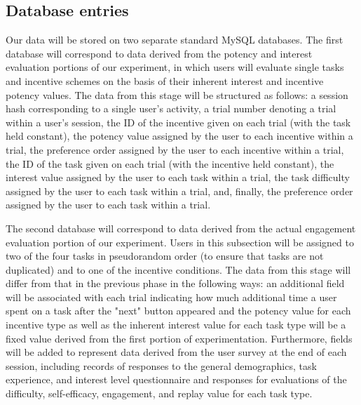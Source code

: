  \subsection{Database entries}
Our data will be stored on two separate standard MySQL databases. The first database will correspond to data derived from the potency and interest evaluation portions of our experiment, in which users will evaluate single tasks and incentive schemes on the basis of their inherent interest and incentive potency values. The data from this stage will be structured as follows: a session hash corresponding to a single user's activity, a trial number denoting a trial within a user's session, the ID of the incentive given on each trial (with the task held constant), the potency value assigned by the user to each incentive within a trial, the preference order assigned by the user to each incentive within a trial, the ID of the task given on each trial (with the incentive held constant), the interest value assigned by the user to each task within a trial, the task difficulty assigned by the user to each task within a trial, and, finally, the preference order assigned by the user to each task within a trial.

The second database will correspond to data derived from the actual engagement evaluation portion of our experiment. Users in this subsection will be assigned to two of the four tasks in pseudorandom order (to ensure that tasks are not duplicated) and to one of the incentive conditions. The data from this stage will differ from that in the previous phase in the following ways: an additional field will be associated with each trial indicating how much additional time a user spent on a task after the "next" button appeared and the potency value for each incentive type as well as the inherent interest value for each task type will be a fixed value derived from the first portion of experimentation. Furthermore, fields will be added to represent data derived from the user survey at the end of each session, including records of responses to the general demographics, task experience, and interest level questionnaire and responses for evaluations of the difficulty, self-efficacy, engagement, and replay value for each task type.

